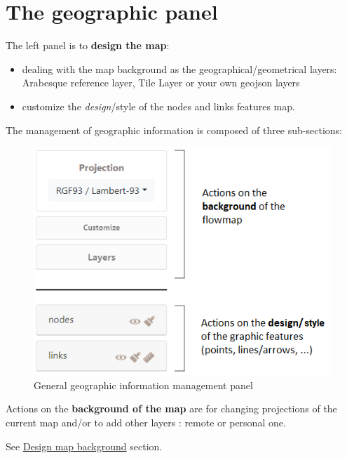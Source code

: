 \documentclass[
  letterpaper,
  DIV=11,
  numbers=noendperiod]{scrreprt}
\begin{document}
\section{The geographic panel}\label{the-geographic-panel}

The left panel is to \textbf{design the map}:

\begin{itemize}
\item
  dealing with the map background as the geographical/geometrical
  layers: Arabesque reference layer, Tile Layer or your own geojson
  layers
\item
  customize the \emph{design}/style of the nodes and links features map.
\end{itemize}

The management of geographic information is composed of three
sub-sections:

\begin{figure}[H]

{\centering \includegraphics{images/geom_panel.png}

}

\caption{General geographic information management panel}

\end{figure}%

Actions on the \textbf{background of the map} are for changing
projections of the current map and/or to add other layers : remote or
personal one.

See \href{./Design-map-background.html}{Design map background} section.
\end{document}
